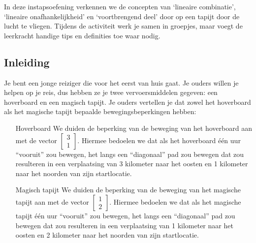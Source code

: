 \documentclass{ximera}
\begin{document}
\author{Alexander Holvoet}

In deze instapsoefening verkennen we de concepten van `lineaire combinatie', `lineaire onafhankelijkheid' en `voortbrengend deel' door op een tapijt door de lucht te vliegen.
Tijdens de activiteit werk je samen in groepjes, maar voegt de leerkracht handige tips en definities toe waar nodig.\newline

\subsection*{Inleiding}
Je bent een jonge reiziger die voor het eerst van huis gaat.
Je ouders willen je helpen op je reis, dus hebben ze je twee vervoersmiddelen gegeven: een hoverboard en een magisch tapijt.
Je ouders vertellen je dat zowel het hoverboard als het magische tapijt bepaalde bewegingsbeperkingen hebben:
\begin{itemize}
    \item[Hoverboard] We duiden de beperking van de beweging van het hoverboard aan met de vector $\begin{bmatrix} 3\\ 1\end{bmatrix}$.
    Hiermee bedoelen we dat als het hoverboard één uur ``vooruit'' zou bewegen, het langs een ``diagonaal'' pad zou bewegen dat zou resulteren in een verplaatsing van 3 kilometer naar het oosten en 1 kilometer naar het noorden van zijn startlocatie.
    \item[Magisch tapijt] We duiden de beperking van de beweging van het magische tapijt aan met de vector $\begin{bmatrix} 1 \\ 2 \end{bmatrix}$.
    Hiermee bedoelen we dat als het magische tapijt één uur ``vooruit'' zou bewegen, het langs een ``diagonaal'' pad zou bewegen dat zou resulteren in een verplaatsing van 1 kilometer naar het oosten en 2 kilometer naar het noorden van zijn startlocatie.
\end{itemize}
\end{document}
